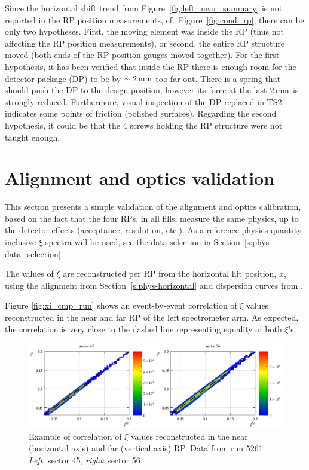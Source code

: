 \documentclass[TOTEM]{cern/cernphprep}
\def\un#1{\,{\rm #1}}
\begin{document}
Since the horizontal shift trend from Figure~\ref{fig:left_near_summary} is not reported in the RP position measurements, cf.~Figure~\ref{fig:cond_rp}, there can be only two hypotheses. First, the moving element was inside the RP (thus not affecting the RP position measurements), or second, the entire RP structure moved (both ends of the RP position gauges moved together). For the first hypothesis, it has been verified that inside the RP there is enough room for the detector package (DP) to be by $\sim 2\un{mm}$ too far out. There is a spring that should push the DP to the design position, however its force at the last $2\un{mm}$ is strongly reduced. Furthermore, visual inspection of the DP replaced in TS2 indicates some points of friction (polished surfaces). Regarding the second hypothesis, it could be that the 4 screws holding the RP structure were not taught enough.



\section{Alignment and optics validation}
\label{s:val}

This section presents a simple validation of the alignment and optics calibration, based on the fact that the four RPs, in all fills, measure the same physics, up to the detector effects (acceptance, resolution, etc.). As a reference physics quantity, inclusive $\xi$ spectra will be used, see the data selection in Section~\ref{s:phys-data_selection}.

The values of $\xi$ are reconstructed per RP from the horizontal hit position, $x$, using the alignment from Section~\ref{s:phys-horizontal} and dispersion curves from \cite{optics_calibration}.

Figure \ref{fig:xi_cmp_run} shows an event-by-event correlation of $\xi$ values reconstructed in the near and far RP of the left spectrometer arm. As expected, the correlation is very close to the dashed line representing equality of both $\xi$'s.


\begin{figure}[h!]
\begin{center}
\includegraphics[width=\hsize]{fig/validation/xi_NF_corr_cmp.pdf}
\caption{%
Example of correlation of $\xi$ values reconstructed in the near (horizontal axis) and far (vertical axis) RP. Data from run 5261. {\it Left}: sector 45, {\it right}: sector 56.
}
\label{fig:xi_NF_cmp}
\end{center}
\end{figure}
\end{document}
